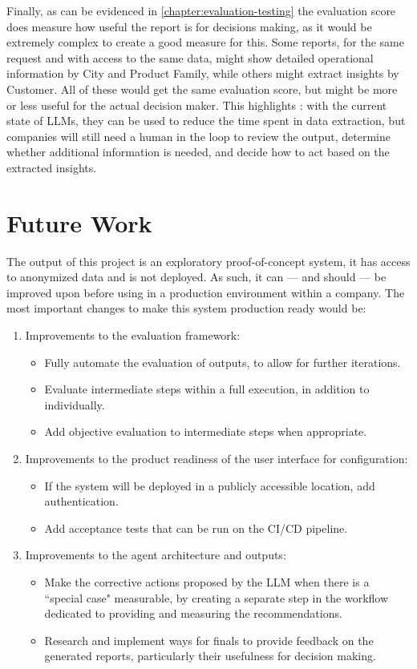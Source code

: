 \documentclass[a4paper]{report}
\begin{document}
Finally, as can be evidenced in \autoref{chapter:evaluation-testing} the evaluation score does measure how useful the report is for decisions making, as it would be extremely complex to create a good measure for this. Some reports, for the same request and with access to the same data, might show detailed operational information by City and Product Family, while others might extract insights by Customer. All of these would get the same evaluation score, but might be more or less useful for the actual decision maker. This highlights \kfid : with the current state of LLMs, they can be used to reduce the time spent in data extraction, but companies will still need a human in the loop to review the output, determine whether additional information is needed, and decide how to act based on the extracted insights.

\section{Future Work}
\label{sec:future-work}

The output of this project is an exploratory proof-of-concept system, it has access to anonymized data and is not deployed. As such, it can --- and should --- be improved upon before using in a production environment within a company. The most important changes to make this system production ready would be:

\begin{enumerate}
    \item Improvements to the evaluation framework:
    \begin{itemize}
        \item Fully automate the evaluation of outputs, to allow for further iterations.
        \item Evaluate intermediate steps within a full execution, in addition to individually.
        \item Add objective evaluation to intermediate steps when appropriate.
    \end{itemize}
    \item Improvements to the product readiness of the user interface for configuration:
    \begin{itemize}
        \item If the system will be deployed in a publicly accessible location, add authentication.
        \item Add acceptance tests that can be run on the CI/CD pipeline.
    \end{itemize}
    \item Improvements to the agent architecture and outputs:
    \begin{itemize}
        \item Make the corrective actions proposed by the LLM when there is a ``special case" measurable, by creating a separate step in the workflow dedicated to providing and measuring the recommendations.
        \item Research and implement ways for finals to provide feedback on the generated reports, particularly their usefulness for decision making.
    \end{itemize}
\end{enumerate}
\end{document}
